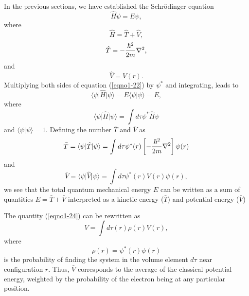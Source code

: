 In the previous sections, we have established the Schr\"odinger equation
\begin{equation}
{\hat H} \psi = E \psi,
\label{eqno1-22}
\end{equation}
where 
\begin{equation}
{\hat H} = {\hat T} + {\hat V} ,
\end{equation}
\begin{equation}
{\hat T} = - {\hbar^2 \over 2m} \nabla^2 ,
\end{equation}
and
\begin{equation}
{\hat V} = V ( r ).
\end{equation}
Multiplying both sides of equation (\ref{eqno1-22}) by $\psi ^*$ and
integrating, leads to
\begin{equation}
\langle \psi \vert {\hat H} \vert \psi \rangle = E \langle \psi | \psi \rangle = E ,
\end{equation}
where
\begin{equation}
\langle \psi \vert {\hat H} \vert \psi \rangle = \int d \tau \psi ^* {\hat H} 
\psi
\end{equation}
and $\langle \psi | \psi \rangle = 1$.   Defining the number ${\bar T}$ and 
${\bar V}$ as
\begin{equation}
{\bar T} = \langle \psi \vert {\hat T} \vert \psi \rangle = \int d \tau 
\psi ^* (r) \left[ - {\hbar^2 \over 2m} \nabla^2 \right] \psi 
(r)
\label{eqno1-23}
\end{equation}
and
\begin{equation}
{\bar V} = \langle \psi \vert {\hat V} \vert \psi \rangle = \int d \tau 
\psi ^* (r) V(r) \psi (r),
\label{eqno1-24}
\end{equation}
we see that the total quantum mechanical energy $E$ can be written 
as a sum of quantities $E = {\bar T} + {\bar V}$ interpreted as a 
kinetic energy (${\bar T}$) and potential energy (${\bar V}$)

The quantity (\ref{eqno1-24}) can be rewritten as
\begin{equation}
V = \int d \tau ( r ) \rho(r) V ( r ),
\end{equation}
where
\begin{equation}
\rho ( r ) = \psi ^* ( r ) \psi ( r )
\end{equation}
is the probability of finding the system in the volume element $d \tau$ 
near configuration $r$. Thus, ${\bar V}$ corresponds to the average of 
the classical potential energy, weighted by the probability of
the electron being at any particular position.

